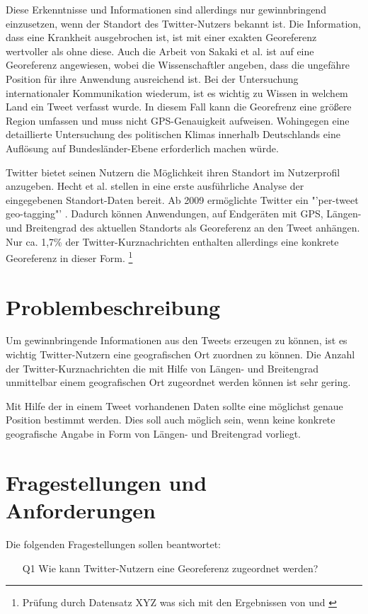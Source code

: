 		Diese Erkenntnisse und Informationen sind allerdings nur gewinnbringend einzusetzen, wenn der Standort des Twitter-Nutzers bekannt ist. 
		Die Information, dass eine Krankheit ausgebrochen ist, ist mit einer exakten Georeferenz wertvoller als ohne diese. 
		Auch die Arbeit von Sakaki et al. ist auf eine Georeferenz angewiesen, wobei die Wissenschaftler angeben, dass die ungefähre Position für ihre Anwendung ausreichend ist.
		Bei der Untersuchung internationaler Kommunikation wiederum, ist es wichtig zu Wissen in welchem Land ein Tweet verfasst wurde.
		In diesem Fall kann die Georefrenz eine größere Region umfassen und muss nicht GPS-Genauigkeit aufweisen.  
		Wohingegen eine detaillierte Untersuchung des politischen Klimas innerhalb Deutschlands eine Auflösung auf Bundesländer-Ebene erforderlich machen würde. 

 		Twitter bietet seinen Nutzern die Möglichkeit ihren Standort im Nutzerprofil anzugeben. 
 		Hecht et al. stellen in \cite{Hecht2011} eine erste ausführliche Analyse der eingegebenen Standort-Daten bereit.  
 		Ab 2009 ermöglichte Twitter ein "'per-tweet geo-tagging"' \cite{Cheng2010}.
 		Dadurch können Anwendungen, auf Endgeräten mit GPS, Längen- und Breitengrad des aktuellen Standorts als Georeferenz an den Tweet anhängen.    
		Nur ca. 1,7\% der Twitter-Kurznachrichten enthalten allerdings eine konkrete Georeferenz in dieser Form. \footnote{Prüfung durch Datensatz XYZ was sich mit den Ergebnissen von \cite{Priedhorsky2013} und \cite{Schulz2013}}


	\section{Problembeschreibung} 
		Um gewinnbringende Informationen aus den Tweets erzeugen zu können, ist es wichtig Twitter-Nutzern eine geografischen Ort zuordnen zu können.
		Die Anzahl der Twitter-Kurznachrichten die mit Hilfe von Längen- und Breitengrad unmittelbar einem geografischen Ort zugeordnet werden können ist sehr gering. 
		 
		Mit Hilfe der in einem Tweet vorhandenen Daten sollte eine möglichst genaue Position bestimmt werden. 
		Dies soll auch möglich sein, wenn keine konkrete geografische Angabe in Form von Längen- und Breitengrad vorliegt. 

	\section{Fragestellungen und Anforderungen}\label{sec:fragestellung}
		Die folgenden Fragestellungen sollen beantwortet: 
		\begin{enumerate}
			\item[Q1] Wie kann Twitter-Nutzern eine Georeferenz zugeordnet werden?
		\end{enumerate}
		  	
